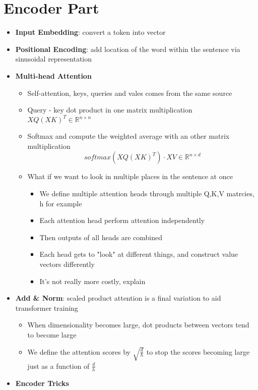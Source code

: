 \section{Encoder Part}
\begin{itemize}
    \item \textbf{Input Embedding}: convert a token into vector
    \item \textbf{Positional Encoding}: add location of the word within the sentence via sinusoidal representation
    \item \textbf{Multi-head Attention}
    \begin{itemize}
        \item Self-attention, keys, queries and vales comes from the same source
        \item Query - key dot product in one matrix multiplication \(XQ(XK)^T \in \mathbb{R}^{n \times n}\)
        \item Softmax and compute the weighted average with an other matrix multiplication
        \[softmax(XQ(XK)^T) \cdot XV  \in \mathbb{R}^{n \times d}\]
        \item What if we want to look in multiple places in the sentence at once
        \begin{itemize}
            \item We define multiple attention heads through multiple Q,K,V matrcies, h for example
            \item Each attention head perform attention independently
            \item Then outputs of all heads are combined
            \item Each head gets to "look" at different things, and construct value vectors differently
            \item It's not really more costly, explain
        \end{itemize}
    \end{itemize}
    \item \textbf{Add \& Norm}: scaled product attention is a final variation to aid transformer training
    \begin{itemize}
        \item When dimensionality becomes large, dot products between vectors tend to become large
        \item We define the attention scores by \(\sqrt{\frac{d}{h}}\) to stop the scores becoming large just as a function of \(\frac{d}{h}\)
    \end{itemize}
    \item \textbf{Encoder Tricks}

\end{itemize}
